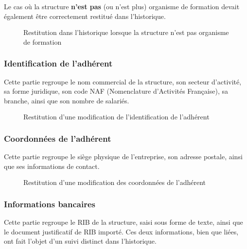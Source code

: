 Le cas où la structure \textbf{n'est pas} (ou n'est plus) organisme de
formation devait également être correctement restitué dans l'historique.

\begin{figure}[H]
  \centering
  \caption{Restitution dans l'historique lorsque la structure n'est pas
    organisme de formation}
  \label{fig:pas-of}
\end{figure}

\subsubsection{Identification de l'adhérent}

Cette partie regroupe le nom commercial de la structure, son secteur
d'activité, sa forme juridique, son code NAF (Nomenclature d'Activités
Française), sa branche, ainsi que son nombre de salariés.

\begin{figure}[H]
  \centering
  \caption{Restitution d'une modification de l'identification de
    l'adhérent}
  \label{fig:modif-identification-adherent}
\end{figure}

\subsubsection{Coordonnées de l'adhérent}

Cette partie regroupe le siège physique de l'entreprise, son adresse
postale, ainsi que ses informations de contact.

\begin{figure}[H]
  \centering
  \caption{Restitution d'une modification des coordonnées de l'adhérent}
  \label{fig:modif-coordonnees-adherent}
\end{figure}

\subsubsection{Informations bancaires}

Cette partie regroupe le RIB de la structure, saisi sous forme de texte,
ainsi que le document justificatif de RIB importé. Ces deux informations,
bien que liées, ont fait l'objet d'un suivi distinct dans l'historique.

